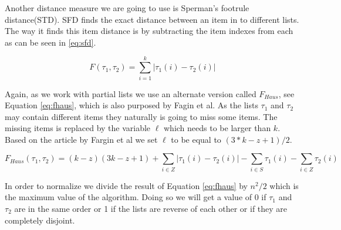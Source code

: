  

Another distance measure we are going to use is Sperman's footrule distance(STD). SFD finds the exact distance between an item in to different lists. The way it finds this item distance is by subtracting the item indexes from each as can be seen in \ref{eq:sfd}. 

\begin{equation}\label{eq:sfd}
F(\tau_1, \tau_2) = \sum_{i=1}^{k} | \tau_1 (i) - \tau_2 (i) |
\end{equation}

Again, as we work with partial lists we use an alternate version called $F_{Haus}$, see Equation \ref{eq:fhaus}, which is also purposed by Fagin et al\citep{comparing:topk}.
As the lists $\tau_1$ and $\tau_2$ may contain different items they naturally is going to miss some items. The missing items is replaced by the variable $\ell$ which needs to be larger than $k$. Based on the article by Fargin et al we set $\ell$ to be equal to $(3 * k - z + 1)/2$.

\footnotesize
\begin{equation}\label{eq:fhaus}
F_{Haus}(\tau_1,\tau_2)= (k-z)(3k-z+1)+\sum_{i\in Z} | \tau_1 (i) - \tau_2 (i) | - \sum_{i\in S} \tau_1 (i) - \sum_{i\in Z} \tau_2(i)
\end{equation}
\normalsize

In order to normalize we divide the result of Equation \ref{eq:fhaus} by $n^2 /2$ which is the maximum value of the algorithm. Doing so we will get a value of 0 if $\tau_1$ and $\tau_2$ are in the same order or 1 if the lists are reverse of each other or if they are completely disjoint. 